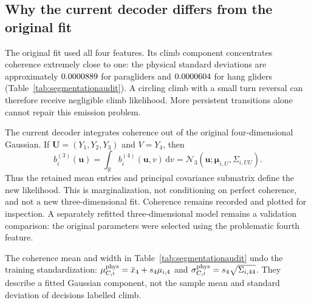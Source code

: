 \subsection{Why the current decoder differs from the original fit}
\label{sec:phaseprovisional}
The original fit used all four features. Its climb component concentrates coherence
extremely close to one: the physical standard deviations are approximately
$0.0000889$ for paragliders and $0.0000604$ for hang gliders
(Table~\ref{tab:segmentationaudit}). A circling climb with a small turn reversal can
therefore receive negligible climb likelihood. More persistent transitions alone cannot
repair this emission problem.

The current decoder integrates coherence out of the original four-dimensional Gaussian.
If $\mathbf U=(Y_1,Y_2,Y_3)$ and $V=Y_4$, then
\begin{equation}
 b_i^{(3)}(\mathbf u)
 =\int_{\mathbb R} b_i^{(4)}(\mathbf u,v)\,\mathrm dv
 =\mathcal N_3(\mathbf u;\boldsymbol\mu_{i,U},\Sigma_{i,UU}).
 \label{eq:phasemarginal}
\end{equation}
Thus the retained mean entries and principal covariance submatrix define the new
likelihood. This is marginalization, not conditioning on perfect coherence, and not a
new three-dimensional fit. Coherence remains recorded and plotted for inspection.
A separately refitted three-dimensional model remains a validation comparison: the
original parameters were selected using the problematic fourth feature.

The coherence mean and width in Table~\ref{tab:segmentationaudit} undo the training
standardization: $\mu_{C,i}^{\rm phys}=\bar x_4+s_4\mu_{i,4}$ and
$\sigma_{C,i}^{\rm phys}=s_4\sqrt{\Sigma_{i,44}}$. They describe a fitted Gaussian
component, not the sample mean and standard deviation of decisions labelled climb.


